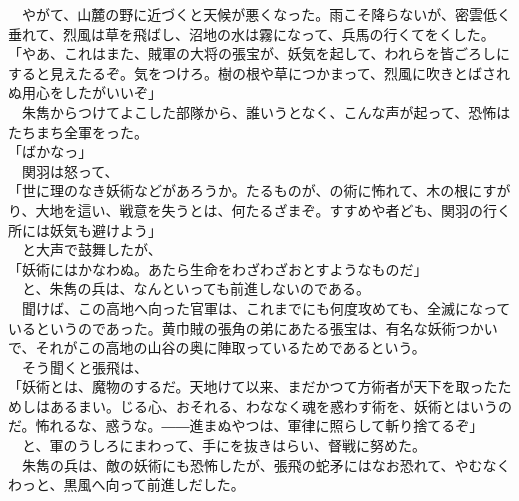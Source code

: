 \documentclass[
  paper=a5,
  fontsize=10pt,
  jafontsize=9.5pt,
  tate,                  %
  open_bracket_pos=nibu, %
]{jlreq}
\begin{document}
　やがて、山麓の野に近づくと天候が悪くなった。雨こそ降らないが、密雲低く垂れて、烈風は草を飛ばし、沼地の水は霧になって、兵馬の行くてをくした。\\


「やあ、これはまた、賊軍の大将の張宝が、妖気を起して、われらを皆ごろしにすると見えたるぞ。気をつけろ。樹の根や草につかまって、烈風に吹きとばされぬ用心をしたがいいぞ」\\


　朱雋からつけてよこした部隊から、誰いうとなく、こんな声が起って、恐怖はたちまち全軍をった。\\


「ばかなっ」\\


　関羽は怒って、\\


「世に理のなき妖術などがあろうか。たるものが、の術に怖れて、木の根にすがり、大地を這い、戦意を失うとは、何たるざまぞ。すすめや者ども、関羽の行く所には妖気も避けよう」\\


　と大声で鼓舞したが、\\


「妖術にはかなわぬ。あたら生命をわざわざおとすようなものだ」\\


　と、朱雋の兵は、なんといっても前進しないのである。\\


　聞けば、この高地へ向った官軍は、これまでにも何度攻めても、全滅になっているというのであった。黄巾賊の張角の弟にあたる張宝は、有名な妖術つかいで、それがこの高地の山谷の奥に陣取っているためであるという。\\


　そう聞くと張飛は、\\


「妖術とは、魔物のするだ。天地けて以来、まだかつて方術者が天下を取ったためしはあるまい。じる心、おそれる、わななく魂を惑わす術を、妖術とはいうのだ。怖れるな、惑うな。――進まぬやつは、軍律に照らして斬り捨てるぞ」\\


　と、軍のうしろにまわって、手にを抜きはらい、督戦に努めた。\\


　朱雋の兵は、敵の妖術にも恐怖したが、張飛の蛇矛にはなお恐れて、やむなくわっと、黒風へ向って前進しだした。\\
\end{document}
